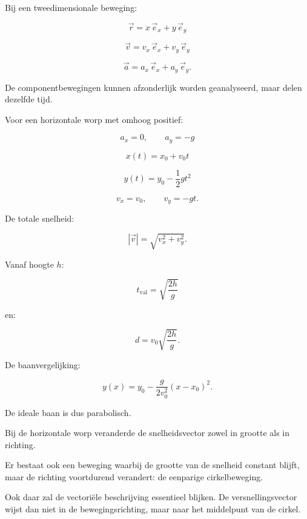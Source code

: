 \documentclass{ximera}
\begin{document}


Bij een tweedimensionale beweging:

\[
\boxed{
\vec r=x\,\vec e_x+y\,\vec e_y
}
\]

\[
\boxed{
\vec v=v_x\,\vec e_x+v_y\,\vec e_y
}
\]

\[
\boxed{
\vec a=a_x\,\vec e_x+a_y\,\vec e_y.
}
\]

De componentbewegingen kunnen afzonderlijk worden geanalyseerd, maar
delen dezelfde tijd.

Voor een horizontale worp met omhoog positief:

\[
\boxed{
a_x=0,
\qquad
a_y=-g
}
\]

\[
\boxed{
x(t)=x_0+v_0t
}
\]

\[
\boxed{
y(t)=y_0-\frac12gt^2
}
\]

\[
\boxed{
v_x=v_0,
\qquad
v_y=-gt.
}
\]

De totale snelheid:

\[
\boxed{
|\vec v|
=
\sqrt{v_x^2+v_y^2}.
}
\]

Vanaf hoogte $h$:

\[
\boxed{
t_{\mathrm{val}}
=
\sqrt{\frac{2h}{g}}
}
\]

en:

\[
\boxed{
d
=
v_0\sqrt{\frac{2h}{g}}.
}
\]

De baanvergelijking:

\[
\boxed{
y(x)
=
y_0-\frac{g}{2v_0^2}(x-x_0)^2.
}
\]

De ideale baan is dus parabolisch.




Bij de horizontale worp veranderde de snelheidsvector zowel in grootte
als in richting.

Er bestaat ook een beweging waarbij de grootte van de snelheid
constant blijft, maar de richting voortdurend verandert: de
eenparige cirkelbeweging.

Ook daar zal de vectoriële beschrijving essentieel blijken. De
versnellingsvector wijst dan niet in de bewegingsrichting, maar naar
het middelpunt van de cirkel.
\end{document}
